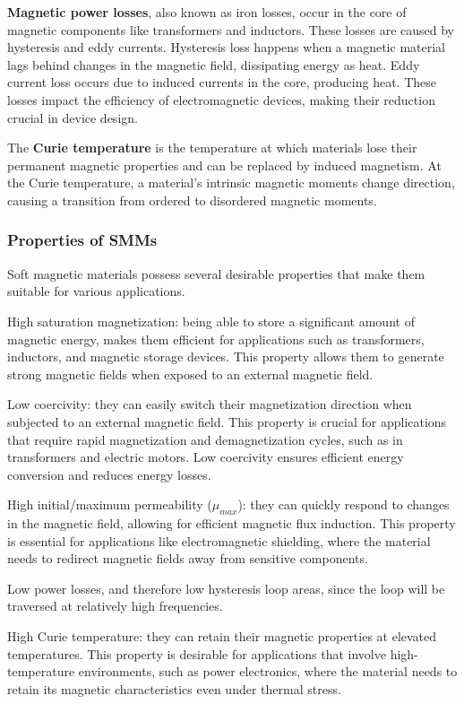 \textbf{Magnetic power losses}, also known as iron losses, occur in the core of magnetic components like transformers and inductors. These losses are caused by hysteresis and eddy currents. Hysteresis loss happens when a magnetic material lags behind changes in the magnetic field, dissipating energy as heat. Eddy current loss occurs due to induced currents in the core, producing heat. These losses impact the efficiency of electromagnetic devices, making their reduction crucial in device design.

The \textbf{Curie temperature} is the temperature at which materials lose their permanent magnetic properties and can be replaced by induced magnetism. At the Curie temperature, a material's intrinsic magnetic moments change direction, causing a transition from ordered to disordered magnetic moments.

\subsubsection{Properties of SMMs}

Soft magnetic materials possess several desirable properties that make them suitable for various applications. \cite{Liogas_Lau_Wang_Brown_Polatidis_Wang_Korsunsky_2023}

High saturation magnetization: being able to store a significant amount of magnetic energy, makes them efficient for applications such as transformers, inductors, and magnetic storage devices. This property allows them to generate strong magnetic fields when exposed to an external magnetic field.

Low coercivity: they can easily switch their magnetization direction when subjected to an external magnetic field. This property is crucial for applications that require rapid magnetization and demagnetization cycles, such as in transformers and electric motors. Low coercivity ensures efficient energy conversion and reduces energy losses.

High initial/maximum permeability ($\mu_{max}$): they can quickly respond to changes in the magnetic field, allowing for efficient magnetic flux induction. This property is essential for applications like electromagnetic shielding, where the material needs to redirect magnetic fields away from sensitive components.

Low power losses, and therefore low hysteresis loop areas, since the loop will be traversed at relatively high frequencies.

    High Curie temperature: they can retain their magnetic properties at elevated temperatures. This property is desirable for applications that involve high-temperature environments, such as power electronics, where the material needs to retain its magnetic characteristics even under thermal stress.

